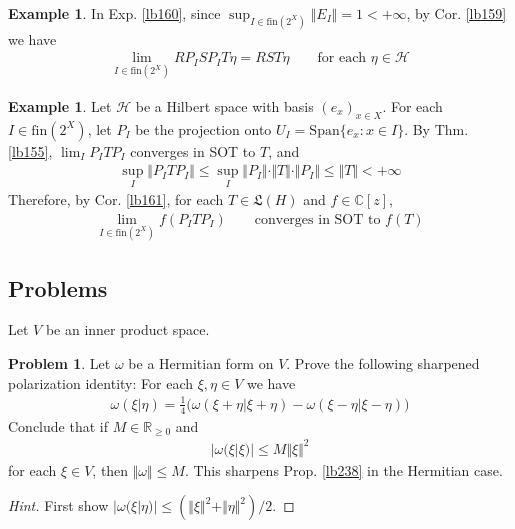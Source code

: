 \documentclass[12pt,b5paper,notitlepage]{article}
\theoremstyle{definition}
\newtheorem{eg}[df]{Example}
\newtheorem{prob}{\color{red}Problem}[section]
\theoremstyle{plain}
\newcommand{\fk}{\mathfrak}
\newcommand{\Span}{\mathrm{Span}}
\newcommand{\Cbb}{\mathbb C}
\newcommand{\Rbb}{\mathbb R}
\newcommand{\fin}{\mathrm{fin}}
\newcommand{\MH}{\mathcal H}
\numberwithin{equation}{section}
\begin{document}
\begin{eg}
In Exp. \ref{lb160}, since $\sup_{I\in\fin(2^X)}\Vert E_I\Vert=1<+\infty$, by Cor. \ref{lb159} we have
\begin{align*}
\lim_{I\in\fin(2^X)}RP_ISP_IT\eta=RST\eta\qquad\text{for each $\eta\in\MH$}
\end{align*}
\end{eg}




\begin{eg}\label{lb397}
Let $\MH$ be a Hilbert space with basis $(e_x)_{x\in X}$. For each $I\in\fin(2^X)$, let $P_I$ be the projection onto $U_I=\Span\{e_x:x\in I\}$. By Thm. \ref{lb155}, $\lim_I P_ITP_I$ converges in SOT to $T$, and 
\begin{align*}
\sup_I\Vert P_ITP_I\Vert\leq\sup_I \Vert P_I\Vert\cdot\Vert T\Vert\cdot\Vert P_I\Vert\leq \Vert T\Vert<+\infty
\end{align*}
Therefore, by Cor. \ref{lb161}, for each $T\in\fk L(H)$ and $f\in\Cbb[z]$, 
\begin{align*}
\lim_{I\in\fin(2^X)} f(P_ITP_I)\qquad\text{converges in SOT to }f(T)
\end{align*}
\end{eg}







\subsection{Problems}


Let $V$ be an inner product space. 
\begin{prob}
Let $\omega$ be a Hermitian form on $V$. Prove the following sharpened polarization identity: For each $\xi,\eta\in V$ we have
\begin{align}\label{eq145}
\omega(\xi|\eta)=\frac 14\big(\omega(\xi+\eta|\xi+\eta)-\omega(\xi-\eta|\xi-\eta)\big)
\end{align}
Conclude that if $M\in\Rbb_{\geq0}$ and
\begin{align*}
|\omega(\xi|\xi)|\leq M\Vert\xi\Vert^2
\end{align*}
for each $\xi\in V$, then $\Vert\omega\Vert\leq M$. This sharpens Prop. \ref{lb238} in the Hermitian case.
\end{prob}


\begin{proof}[Hint]
First show $|\omega(\xi|\eta)|\leq (\Vert\xi\Vert^2+\Vert\eta\Vert^2)/2$.
\end{proof}
\end{document}
